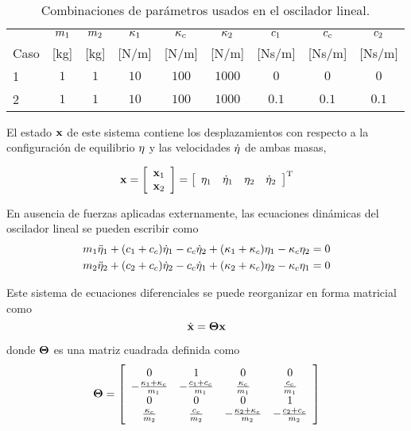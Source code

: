 \begin{table}[ht]
	\caption{Combinaciones de parámetros usados en el oscilador lineal.}
	\begin{center}
		\label{tab:DLOpp}
		{ \footnotesize{
				\renewcommand{\arraystretch}{1.25}
				\begin{tabular}{lcccccccc}
					\hline
					& $\mass_1$ 	& $\mass_2$ 	&$\stiffness_1$ & $\stiffness_c$  &$\stiffness_2$ &$\damping_1$ & $\damping_c$ &$\damping_2$ \\
					Caso	& [kg]		& [kg]	& [N/m] & [N/m] & [N/m] & [Ns/m] & [Ns/m] & [Ns/m]  \\
					\hline
					1		& $1$ 		& $1$ 	& $10$ & $100$ & $1000$ & $0$ & $0$ & $0$ \\
					2		& $1$ 		& $1$ 	& $10$ & $100$ & $1000$ & $0.1$ & $0.1$ & $0.1$ \\
				\end{tabular}
		}}
	\end{center}
\end{table}

El estado $\state$ de este sistema contiene los desplazamientos con respecto a la configuración de equilibrio $\displacement$ y las velocidades $\velocity$ de ambas masas,

\begin{equation}
	\state = \sqbr{\matr{c}{\state_1 \\ \state_2}} =  \sqbr{\hvect{cccc}{\displacement_1 & \velocity_1 & \displacement_2 & \velocity_2}}\trans
\end{equation}

En ausencia de fuerzas aplicadas externamente, las ecuaciones dinámicas del oscilador lineal se pueden escribir como
%
\begin{align}
    \mass_1 \acceleration_1 + (\damping_1 + \damping_c) \velocity_1 - \damping_c \velocity_2 + (\stiffness_1 + \stiffness_c) \displacement_1 - \stiffness_c \displacement_2 &= 0\\
    \mass_2 \acceleration_2 + (\damping_2 + \damping_c) \velocity_2 - \damping_c \velocity_1 + (\stiffness_2 + \stiffness_c) \displacement_2 - \stiffness_c \displacement_1 &= 0
\end{align}

Este sistema de ecuaciones diferenciales se puede reorganizar en forma matricial como
%
\begin{equation}
	\dot{\state} = \matLO \state
	\label{eq:LOana}
\end{equation}

donde $\matLO$ es una matriz cuadrada definida como
%
\begin{equation}
	\matLO = \sqbr{\matr{cccc}{0& 1& 0& 0\\
						-\frac{\stiffness_1 + \stiffness_c}{\mass_1}& -\frac{\damping_1 + \damping_c}{\mass_1}& \frac{\stiffness_c}{\mass_1}& \frac{\damping_c}{\mass_1}\\
						 0& 0& 0& 1\\
					 	\frac{\stiffness_c}{\mass_2}& \frac{\damping_c}{\mass_2}& -\frac{\stiffness_2 + \stiffness_c}{\mass_2}& -\frac{\damping_2 + \damping_c}{\mass_2}}}
\end{equation}

